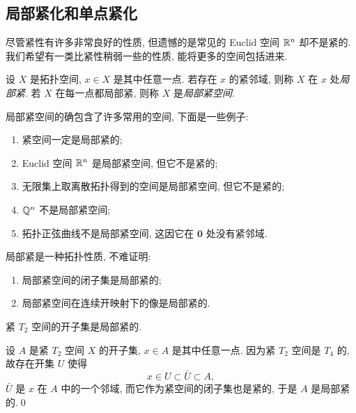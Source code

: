 \subsection{局部紧化和单点紧化}

    尽管紧性有许多非常良好的性质, 但遗憾的是常见的 Euclid 空间 $ \mathbb{R}^n $ 却不是紧的. 我们希望有一类比紧性稍弱一些的性质, 能将更多的空间包括进来.

    \begin{Definition}[局部紧]
        设 $ X $ 是拓扑空间, $ x\in X $ 是其中任意一点. 若存在 $ x $ 的紧邻域, 则称 $ X $ 在 $ x $ 处\emph{局部紧}. 若 $ X $ 在每一点都局部紧, 则称 $ X $ 是\emph{局部紧空间}.
    \end{Definition}

    \begin{Example}
        局部紧空间的确包含了许多常用的空间, 下面是一些例子:
        \begin{enumerate}
            \item 紧空间一定是局部紧的;
            \item Euclid 空间 $ \mathbb{R}^n $ 是局部紧空间, 但它不是紧的;
            \item 无限集上取离散拓扑得到的空间是局部紧空间, 但它不是紧的;
            \item $ \mathbb{Q}^n $ 不是局部紧空间;
            \item 拓扑正弦曲线不是局部紧空间, 这因它在 $ \mathbf{0} $ 处没有紧邻域.
        \end{enumerate}
    \end{Example}

    \begin{Proposition}
        局部紧是一种拓扑性质, 不难证明:
        \begin{enumerate}
            \item 局部紧空间的闭子集是局部紧的;
            \item 局部紧空间在连续开映射下的像是局部紧的.
        \end{enumerate}
    \end{Proposition}

    \begin{Proposition}
        紧 $ T_2 $ 空间的开子集是局部紧的.
    \end{Proposition}
    \begin{Proof}
        设 $ A $ 是紧 $ T_2 $ 空间 $ X $ 的开子集, $ x\in A $ 是其中任意一点. 因为紧 $ T_2 $ 空间是 $ T_4 $ 的, 故存在开集 $ U $ 使得
        \[
            x\in U\subset\bar{U}\subset A,
        \]
        $ \bar{U} $ 是 $ x $ 在 $ A $ 中的一个邻域, 而它作为紧空间的闭子集也是紧的, 于是 $ A $ 是局部紧的.\qed
    \end{Proof}

